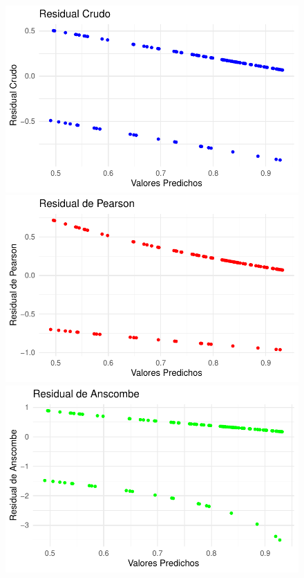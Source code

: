 \documentclass[
  letterpaper,
  DIV=11,
  numbers=noendperiod]{scrartcl}
\begin{document}
\begin{figure}

\begin{minipage}{0.50\linewidth}
\includegraphics{Modelos_files/figure-pdf/unnamed-chunk-48-1.pdf}\end{minipage}%
%
\begin{minipage}{0.50\linewidth}
\includegraphics{Modelos_files/figure-pdf/unnamed-chunk-48-2.pdf}\end{minipage}%
\newline
\begin{minipage}{0.50\linewidth}
\includegraphics{Modelos_files/figure-pdf/unnamed-chunk-48-3.pdf}\end{minipage}%

\end{figure}
\end{document}
